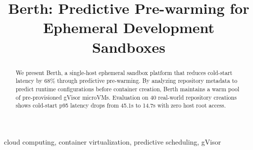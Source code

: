 \documentclass[conference]{IEEEtran}
\begin{document}
\title{Berth: Predictive Pre-warming for Ephemeral Development Sandboxes}
\author{
}
\maketitle

\begin{abstract}
We present Berth, a single-host ephemeral sandbox platform that reduces cold-start latency by 68\% through predictive pre-warming. By analyzing repository metadata to predict runtime configurations before container creation, Berth maintains a warm pool of pre-provisioned gVisor microVMs. Evaluation on 40 real-world repository creations shows cold-start p95 latency drops from 45.1s to 14.7s with zero host root access.
\end{abstract}

\begin{IEEEkeywords}
cloud computing, container virtualization, predictive scheduling, gVisor
\end{IEEEkeywords}










\end{document}
